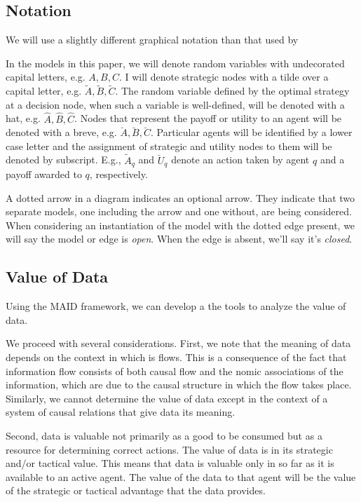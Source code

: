 \documentclass[../thesis.tex]{subfiles}
\begin{document}

\subsection{Notation}
\label{sec:maid-notation}

We will use a slightly different graphical notation than that used by
\cite{koller2003multi}

In the models in this paper, we will denote random variables
with undecorated capital letters, e.g. $A, B, C$.
I will denote strategic nodes with a tilde over a capital
letter, e.g. $\tilde{A}, \tilde{B}, \tilde{C}$.
The random variable defined by the optimal strategy at a
decision node, when such a variable is well-defined,
will be denoted with a hat, e.g. $\hat{A}, \hat{B}, \hat{C}$.
Nodes that represent the payoff or utility to an
agent will be denoted with a breve, e.g.
$\breve{A}, \breve{B}, \breve{C}$.
Particular agents will be identified by a lower case
letter and the assignment of strategic and utility nodes
to them will be denoted by subscript.
E.g., $\tilde{A}_q$ and $\breve{U}_q$ denote an action
taken by agent $q$ and a payoff awarded to $q$,
respectively.

A dotted arrow in a diagram indicates an optional arrow.
They indicate that two separate models, one including the
arrow and one without, are being considered.
When considering an instantiation of the model with the dotted
edge present, we will say the model or edge is \emph{open}.
When the edge is absent, we'll say it's \emph{closed}.

\subsection{Value of Data}
\label{sec:value-of-data}

Using the MAID framework, we can develop a
the tools to analyze the value of data.

We proceed with several considerations.
First, we note that the meaning of data depends
on the context in which is flows.
This is a consequence of the fact that information
flow consists of both causal flow and the nomic
associations of the information, which are due
to the causal structure in which the flow takes
place.
Similarly, we cannot determine the value of data
except in the context of a system of causal relations
that give data its meaning.

Second, data is valuable not primarily as a good to
be consumed but as a resource for determining
correct actions.
The value of data is in its strategic and/or tactical
value.
This means that data is valuable only in so far as it
is available to an active agent.
The value of the data to that agent will be the value
of the strategic or tactical advantage that the data
provides.
\end{document}
